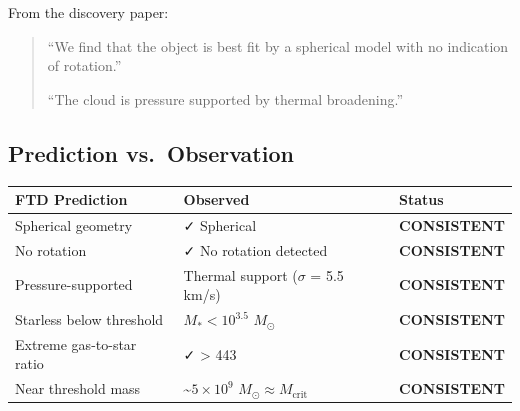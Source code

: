 \documentclass[
  11pt,
  letterpaper,
  twoside,
  openright]{book}
\begin{document}
From the discovery paper:

\begin{quote}
``We find that the object is best fit by a spherical model with no
indication of rotation.''

``The cloud is pressure supported by thermal broadening.''
\end{quote}

\subsection{Prediction
vs.~Observation}\label{prediction-vs.-observation}

\begin{longtable}[]{@{}
  >{\raggedright\arraybackslash}p{}
  >{\raggedright\arraybackslash}p{}
  >{\raggedright\arraybackslash}p{}@{}}
\toprule\noalign{}
\begin{minipage}[b]{\linewidth}\raggedright
FTD Prediction
\end{minipage} & \begin{minipage}[b]{\linewidth}\raggedright
Observed
\end{minipage} & \begin{minipage}[b]{\linewidth}\raggedright
Status
\end{minipage} \\
\midrule\noalign{}
\endhead
\bottomrule\noalign{}
\endlastfoot
Spherical geometry & ✓ Spherical & \textbf{CONSISTENT} \\
No rotation & ✓ No rotation detected & \textbf{CONSISTENT} \\
Pressure-supported & Thermal support (\(\sigma\) = 5.5 km/s) &
\textbf{CONSISTENT} \\
Starless below threshold & \(M_* < 10^{3.5}\) \(M_\odot\) &
\textbf{CONSISTENT} \\
Extreme gas-to-star ratio & ✓ \textgreater{} 443 &
\textbf{CONSISTENT} \\
Near threshold mass & \textasciitilde{}\(5 \times 10^9\)
\(M_\odot \approx M_{\text{crit}}\) & \textbf{CONSISTENT} \\
\end{longtable}
\end{document}
